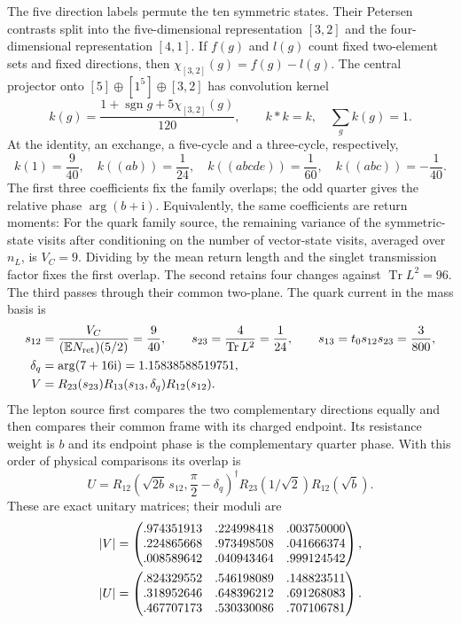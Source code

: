 \documentclass[aps,prx,onecolumn,10pt,notitlepage,nofootinbib,longbibliography]{revtex4-2}
\numberwithin{equation}{section}
\numberwithin{table}{section}
\newcommand{\EE}{\mathbb E}
\newcommand{\Tr}{\operatorname{Tr}}
\newcommand{\sgn}{\operatorname{sgn}}
\newcommand{\ii}{\mathrm i}
\begin{document}
The five direction labels permute the ten symmetric states. Their Petersen contrasts split into the five-dimensional representation $[3,2]$ and the four-dimensional representation $[4,1]$. If $f(g)$ and $l(g)$ count fixed two-element sets and fixed directions, then $\chi_{[3,2]}(g)=f(g)-l(g)$. The central projector onto $[5]\oplus[1^5]\oplus[3,2]$ has convolution kernel
\begin{equation}
 k(g)=\frac{1+\sgn g+5\chi_{[3,2]}(g)}{120},\qquad
 k*k=k,\quad\sum_gk(g)=1.
 \label{eq:mixingcharacters}
\end{equation}
At the identity, an exchange, a five-cycle and a three-cycle, respectively,
\begin{equation}
 k(1)=\frac9{40},\quad k((ab))=\frac1{24},\quad
 k((abcde))=\frac1{60},\quad k((abc))=-\frac1{40}.
 \label{eq:mixingcharactervalues}
\end{equation}
The first three coefficients fix the family overlaps; the odd quarter gives the relative phase $\arg(b+\ii)$. Equivalently, the same coefficients are return moments:
For the quark family source, the remaining variance of the symmetric-state visits after conditioning on the number of vector-state visits, averaged over $n_L$, is $V_C=9$. Dividing by the mean return length and the singlet transmission factor fixes the first overlap. The second retains four changes against $\Tr L^2=96$. The third passes through their common two-plane. The quark current in the mass basis is
\begin{align}
 s_{12}&=\frac{V_C}{(\EE N_{\rm ret})(5/2)}=\frac9{40},\qquad
 s_{23}=\frac4{\Tr L^2}=\frac1{24},\qquad
 s_{13}=t_0s_{12}s_{23}=\frac3{800},\notag\\
 \delta_q&=\arg(7+16\ii)=1.15838588519751,\notag\\
 V&=R_{23}(s_{23})R_{13}(s_{13},\delta_q)R_{12}(s_{12}).
 \label{eq:V}
\end{align}
The lepton source first compares the two complementary directions equally and then compares their common frame with its charged endpoint. Its resistance weight is $b$ and its endpoint phase is the complementary quarter phase. With this order of physical comparisons its overlap is
\begin{equation}
 U=R_{12}\left(\sqrt{2b}\,s_{12},\frac\pi2-\delta_q\right)^\dagger
 R_{23}(1/\sqrt2)R_{12}(\sqrt b).
 \label{eq:U}
\end{equation}
These are exact unitary matrices; their moduli are
\begin{align}
 |V|&=\begin{pmatrix}
 .974351913&.224998418&.003750000\\
 .224865668&.973498508&.041666374\\
 .008589642&.040943464&.999124542
 \end{pmatrix},\notag\\
 |U|&=\begin{pmatrix}
 .824329552&.546198089&.148823511\\
 .318952646&.648396212&.691268083\\
 .467707173&.530330086&.707106781
 \end{pmatrix}.
\end{align}
\end{document}
